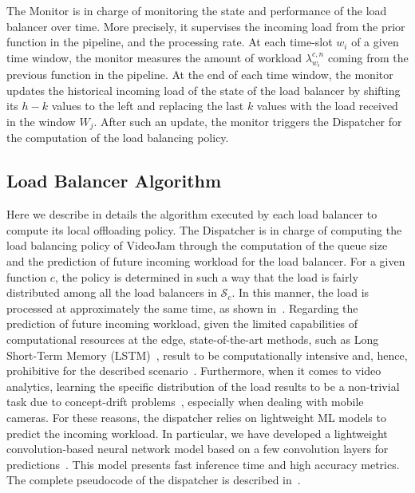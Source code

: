 The Monitor is in charge of monitoring the state and performance of the load balancer over time. More precisely, it supervises the incoming load from the prior function in the pipeline, and the processing rate. At each time-slot $w_i$ of a given time window, the monitor measures the amount of workload $\lambda^{c,n}_{w_i}$ coming from the previous function in the pipeline. At the end of each time window, the monitor updates the historical incoming load of the state of the load balancer by shifting its $h-k$ values to the left and replacing the last $k$ values with the load received in the window $W_{j}$. After such an update, the monitor triggers the Dispatcher for the computation of the load balancing policy.

\subsection{Load Balancer Algorithm}\label{subsec:dispatcher}
Here we describe in details the algorithm executed by each load balancer to compute its local offloading policy. The Dispatcher is in charge of computing the load balancing policy of VideoJam through the computation of the queue size and the prediction of future incoming workload for the load balancer. For a given function $c$, the policy is determined in such a way that the load is fairly distributed among all the load balancers in $\mathcal{S}_c$. In this manner, the load is processed at approximately the same time, as shown in~\cite{shah2007design}. Regarding the prediction of future incoming workload, given the limited capabilities of computational resources at the edge, state-of-the-art methods, such as Long Short-Term Memory (LSTM)~\cite{greff2016lstm}, result to be computationally intensive and, hence, prohibitive for the described scenario~\cite{lalapura2021recurrent}. Furthermore, when it comes to video analytics, learning the specific distribution of the load results to be a non-trivial task due to concept-drift problems~\cite{bhardwaj2022ekya},
especially when dealing with mobile cameras. For these reasons, the dispatcher relies on lightweight ML models to predict the incoming workload. In particular, we have developed a lightweight convolution-based neural network model based on a few convolution layers for predictions~\cite{KerasTCN}. This model presents fast inference time and high accuracy metrics. The complete pseudocode of the dispatcher is described in~.


